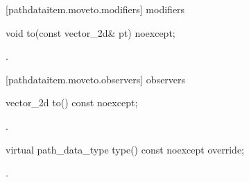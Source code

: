  [pathdataitem.moveto.modifiers]{ modifiers}

\begin{itemdecl}
    void to(const vector_2d& pt) noexcept;
\end{itemdecl}
\begin{itemdescr}
	\pnum
	\postconditions
	.
	
\end{itemdescr}

 [pathdataitem.moveto.observers]{ observers}

\begin{itemdecl}
    vector_2d to() const noexcept;
\end{itemdecl}
\begin{itemdescr}
	\pnum
	\returns
	.

\end{itemdescr}

\begin{itemdecl}
    virtual path_data_type type() const noexcept override;
\end{itemdecl}
\begin{itemdescr}
	\pnum
	\returns
	.

\end{itemdescr}
